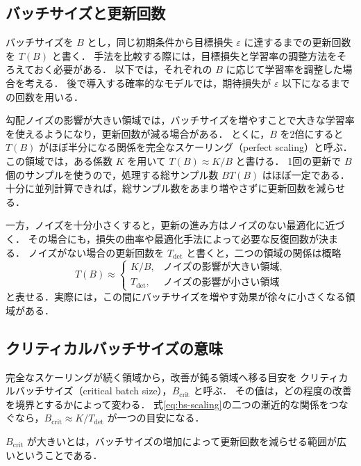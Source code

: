 \documentclass[../main.tex]{subfiles}
\begin{document}
\subsection{バッチサイズと更新回数}

バッチサイズを $B$ とし，同じ初期条件から目標損失 $\varepsilon$ に達するまでの更新回数を $T(B)$ と書く．
手法を比較する際には，目標損失と学習率の調整方法をそろえておく必要がある．
以下では，それぞれの $B$ に応じて学習率を調整した場合を考える．
後で導入する確率的なモデルでは，期待損失が $\varepsilon$ 以下になるまでの回数を用いる．

勾配ノイズの影響が大きい領域では，バッチサイズを増やすことで大きな学習率を使えるようになり，更新回数が減る場合がある．
とくに，$B$ を2倍にすると $T(B)$ がほぼ半分になる関係を完全なスケーリング（perfect scaling）と呼ぶ．
この領域では，ある係数 $K$ を用いて $T(B)\approx K/B$ と書ける．
1回の更新で $B$ 個のサンプルを使うので，処理する総サンプル数 $BT(B)$ はほぼ一定である．
十分に並列計算できれば，総サンプル数をあまり増やさずに更新回数を減らせる．

一方，ノイズを十分小さくすると，更新の進み方はノイズのない最適化に近づく．
その場合にも，損失の曲率や最適化手法によって必要な反復回数が決まる．
ノイズがない場合の更新回数を $T_{\mathrm{det}}$ と書くと，二つの領域の関係は概略
\begin{equation}
  T(B)\approx
  \begin{cases}
    K/B, & \text{ノイズの影響が大きい領域},\\
    T_{\mathrm{det}}, & \text{ノイズの影響が小さい領域}
  \end{cases}
  \label{eq:bs-scaling}
\end{equation}
と表せる．実際には，この間にバッチサイズを増やす効果が徐々に小さくなる領域がある．

\subsection{クリティカルバッチサイズの意味}

完全なスケーリングが続く領域から，改善が鈍る領域へ移る目安を
クリティカルバッチサイズ（critical batch size），$B_{\mathrm{crit}}$ と呼ぶ．
その値は，どの程度の改善を境界とするかによって変わる．
式\eqref{eq:bs-scaling}の二つの漸近的な関係をつなぐなら，$B_{\mathrm{crit}}\approx K/T_{\mathrm{det}}$ が一つの目安になる．

$B_{\mathrm{crit}}$ が大きいとは，バッチサイズの増加によって更新回数を減らせる範囲が広いということである．
\end{document}
